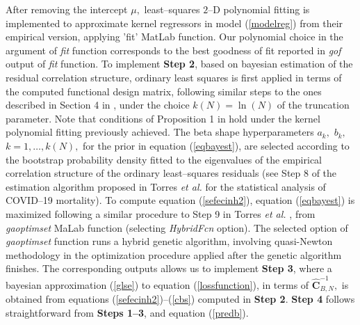 \documentclass[11pt,a4paper]{article}
\begin{document}
 After removing the intercept $\mu,$
least--squares $2$--D polynomial fitting  is implemented  to approximate kernel regressors in  model (\ref{modelreg}) from their empirical version, applying  'fit' MatLab function. Our polynomial choice in the argument of \emph{fit} function corresponds to the best goodness of fit reported in \emph{gof} output of \emph{fit}  function. To implement \textbf{Step 2}, based on bayesian estimation of the residual correlation structure,  ordinary least squares is first applied in terms of the computed functional design matrix, following similar steps to the ones described in Section 4 in \cite{RuizMedinaMirandaEspejo19}, under the choice $k(N)=\ln(N)$ of the truncation parameter. Note that  conditions of Proposition 1 in  \cite{RuizMedinaMirandaEspejo19} hold under the kernel polynomial fitting previously achieved.  The beta shape hyperparameters $a_{k},$ $b_{k},$  $k=1,\dots, k(N),$ for the prior in equation (\ref{eqbayest}), are selected according to the bootstrap probability density fitted  to the eigenvalues of the empirical correlation structure of the ordinary least--squares residuals (see Step 8 of the estimation algorithm proposed in Torres \emph{et al.} \cite{TorresSignes21} for the statistical analysis of COVID--19 mortality).  To compute equation (\ref{sefecinh2}), equation (\ref{eqbayest}) is maximized following a similar procedure to Step 9 in Torres \emph{et al.} \cite{TorresSignes21}, from  \emph{gaoptimset} MaLab function (selecting
\emph{HybridFcn} option). The selected option of \emph{gaoptimset}  function runs a hybrid genetic algorithm, involving quasi-Newton methodology in the optimization procedure applied after the  genetic
 algorithm finishes. The corresponding outputs allows us to implement \textbf{Step 3}, where a bayesian  approximation  (\ref{glse}) to equation     (\ref{lossfunction}), in terms of  $\widehat{\mathbf{C}}^{-1}_{B,N},$ is obtained from equations (\ref{sefecinh2})--(\ref{cbs}) computed  in \textbf{Step 2}.  \textbf{Step 4} follows straightforward from \textbf{Steps 1--3}, and equation (\ref{predb}).
\end{document}
